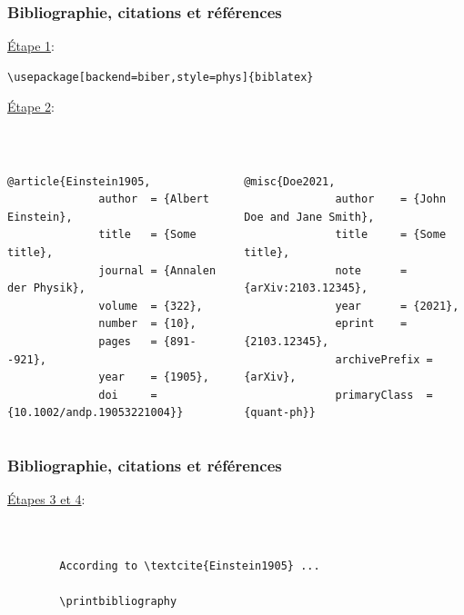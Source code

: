 \begin{frame}[fragile]
    \frametitle{Bibliographie, citations et références}
    \underline{Étape 1}:
    \begin{lstlisting}[xleftmargin=-1.5cm, basicstyle=\small]
        \usepackage[backend=biber,style=phys]{biblatex}
    \end{lstlisting}
    \vfill
    \pause
    \underline{Étape 2}:
    \begin{lstlisting}[xleftmargin=-1.5cm, basicstyle=\small]
        
    \end{lstlisting}
    \begin{columns}
        \begin{lstlisting}[xleftmargin=-1cm, basicstyle=\footnotesize]
            @article{Einstein1905,
              author  = {Albert Einstein},
              title   = {Some title},
              journal = {Annalen der Physik},
              volume  = {322},
              number  = {10},
              pages   = {891--921},
              year    = {1905},
              doi     = {10.1002/andp.19053221004}}
        \end{lstlisting}
        \begin{lstlisting}[xleftmargin=-1cm, basicstyle=\footnotesize]
            @misc{Doe2021,
              author    = {John Doe and Jane Smith},
              title     = {Some title},
              note      = {arXiv:2103.12345},
              year      = {2021},
              eprint    = {2103.12345},
              archivePrefix = {arXiv},
              primaryClass  = {quant-ph}}
        \end{lstlisting}
    \end{columns}
\end{frame}

\begin{frame}[fragile]
    \frametitle{Bibliographie, citations et références}
    \underline{Étapes 3 et 4}:
    \vfill
    \begin{lstlisting}[xleftmargin=-1cm, basicstyle=\small]
       

        According to \textcite{Einstein1905} ...

        \printbibliography

        
    \end{lstlisting}
\end{frame}

